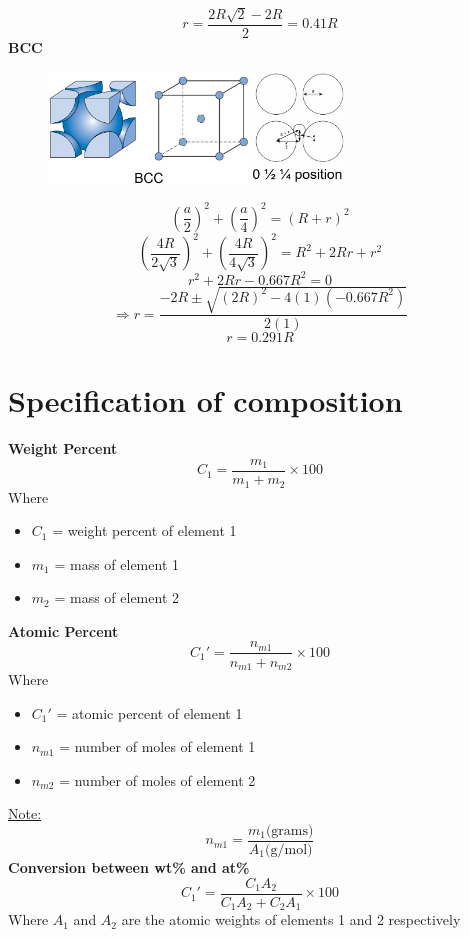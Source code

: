 \documentclass[12pt]{article}
\begin{document}
\[\boxed{r=\frac{2R\sqrt{2}-2R}{2}=0.41R}\]
\noindent\textbf{BCC}
\begin{figure}[H]
    \centering
    \includegraphics[width=0.7\textwidth]{BCC radius.png}
\end{figure}
\vspace{-2em}
\[\left(\frac{a}{2}\right)^2+\left(\frac{a}{4}\right)^2=(R+r)^2\]
\[\left(\frac{4R}{2\sqrt{3}}\right)^2+\left(\frac{4R}{4\sqrt{3}}\right)^2=R^2+2Rr+r^2\]
\[r^2+2Rr-0.667R^2=0\]
\[\Rightarrow r=\frac{-2R\pm\sqrt{(2R)^2-4(1)(-0.667R^2)}}{2(1)}\]
\[\boxed{r=0.291R}\]
\newpage
\section*{Specification of composition}
\noindent\textbf{Weight Percent}
\[C_1=\frac{m_1}{m_1+m_2}\times 100\]
Where
\begin{itemize}
    \item $C_1$ = weight percent of element 1
    \item $m_1$ = mass of element 1
    \item $m_2$ = mass of element 2 
\end{itemize}
\noindent\textbf{Atomic Percent}
\[C_1'=\frac{n_{m1}}{n_{m1}+n_{m2}}\times 100\]
Where
\begin{itemize}
    \item $C_1'$ = atomic percent of element 1
    \item $n_{m1}$ = number of moles of element 1
    \item $n_{m2}$ = number of moles of element 2
\end{itemize}
\underline{Note:}
\[n_{m1} = \frac{m_1 \text{(grams)}}{A_1 \text{(g/mol)}}\]
\noindent\textbf{Conversion between wt\% and at\%}
\[C_1'=\frac{C_1A_2}{C_1A_2 + C_2A_1}\times 100\]
Where $A_1$ and $A_2$ are the atomic weights of elements 1 and 2 respectively
\newpage
\end{document}
